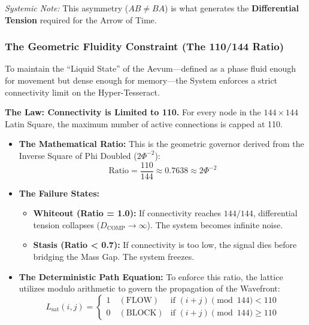 \documentclass[12pt]{amsart}
\begin{document}
\textit{Systemic Note:} This asymmetry ($AB \neq BA$) is what generates the \textbf{Differential Tension} required for the Arrow of Time.

\subsubsection*{The Geometric Fluidity Constraint (The 110\slash 144 Ratio)}\label{sec:5.5}
To maintain the ``Liquid State'' of the Aevum---defined as a phase fluid enough for movement but dense enough for memory---the System enforces a strict connectivity limit on the Hyper-Tesseract.

\vspace{1em}
\textbf{The Law: Connectivity is Limited to 110.}
For every node in the $144 \times 144$ Latin Square, the maximum number of active connections is capped at 110.

\begin{itemize}
    \item \textbf{The Mathematical Ratio:} This is the geometric governor derived from the Inverse Square of Phi Doubled ($2\Phi^{-2}$):
    \begin{equation}
        \text{Ratio} = \frac{110}{144} \approx 0.7638 \approx 2\Phi^{-2}
    \end{equation}

    \item \textbf{The Failure States:}
    \begin{itemize}
        \item \textbf{Whiteout (Ratio = 1.0):} If connectivity reaches $144\slash 144$, differential tension collapses ($D_{\text{COMP}} \to \infty$). The system becomes infinite noise.
        \item \textbf{Stasis (Ratio < 0.7):} If connectivity is too low, the signal dies before bridging the Mass Gap. The system freezes.
    \end{itemize}

    \item \textbf{The Deterministic Path Equation:}
    To enforce this ratio, the lattice utilizes modulo arithmetic to govern the propagation of the Wavefront:
    \begin{equation}
        L_{\text{sat}}(i,j) = 
        \begin{cases} 
        1 \quad (\text{FLOW}) & \text{if } (i+j) \pmod{144} < 110 \\
        0 \quad (\text{BLOCK}) & \text{if } (i+j) \pmod{144} \ge 110 
        \end{cases}
    \end{equation}
\end{itemize}
\end{document}
